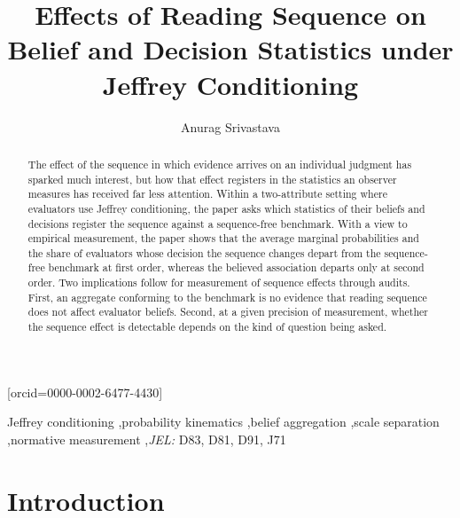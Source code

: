\documentclass[a4paper,fleqn]{cas-sc}
\theoremstyle{remark}
\theoremstyle{definition}
\begin{document}
\let\WriteBookmarks\relax
\def\floatpagepagefraction{1}
\def\textpagefraction{.001}


\title[mode=title]{Effects of Reading Sequence on Belief and Decision Statistics under Jeffrey Conditioning}

\author[1]{Anurag Srivastava}[orcid=0000-0002-6477-4430]
\cormark[1]



\begin{abstract}
The effect of the sequence in which evidence arrives on an individual judgment has sparked much interest, but how that effect registers in the statistics an observer measures has received far less attention. Within a two-attribute setting where evaluators use Jeffrey conditioning, the paper asks which statistics of their beliefs and decisions register the sequence against a sequence-free benchmark. With a view to empirical measurement, the paper shows that the average marginal probabilities and the share of evaluators whose decision the sequence changes depart from the sequence-free benchmark at first order, whereas the believed association departs only at second order.  Two implications follow for measurement of sequence effects through audits. First, an aggregate conforming to the benchmark is no evidence that reading sequence does not affect evaluator beliefs. Second, at a given precision of measurement, whether the sequence effect is detectable depends on the kind of question being asked.
\end{abstract}

\begin{keywords}
Jeffrey conditioning \sep probability kinematics \sep belief aggregation \sep scale separation \sep normative measurement \sep \textit{JEL:} D83, D81, D91, J71
\end{keywords}

\maketitle

\section{Introduction}
\label{sec:intro}
\end{document}
